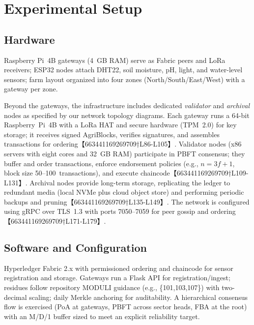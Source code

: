 \section{Experimental Setup}

\subsection{Hardware}
Raspberry Pi~4B gateways (4~GB RAM) serve as Fabric peers and LoRa receivers; ESP32 nodes attach DHT22, soil moisture, pH, light, and water-level sensors; farm layout organized into four zones (North/South/East/West) with a gateway per zone. %

Beyond the gateways, the infrastructure includes dedicated \emph{validator} and \emph{archival} nodes as specified by our network topology diagrams.  Each gateway runs a 64-bit Raspberry~Pi~4B with a LoRa HAT and secure hardware (TPM~2.0) for key storage; it receives signed AgriBlocks, verifies signatures, and assembles transactions for ordering【663441169269709†L86-L105】.  Validator nodes (x86 servers with eight cores and 32~GB RAM) participate in PBFT consensus; they buffer and order transactions, enforce endorsement policies (e.g., $n=3f+1$, block size 50–100~transactions), and execute chaincode【663441169269709†L109-L131】.  Archival nodes provide long-term storage, replicating the ledger to redundant media (local NVMe plus cloud object store) and performing periodic backups and pruning【663441169269709†L135-L149】.  The network is configured using gRPC over TLS~1.3 with ports 7050–7059 for peer gossip and ordering【663441169269709†L171-L179】.

\subsection{Software and Configuration}
Hyperledger Fabric 2.x with permissioned ordering and chaincode for sensor registration and storage. Gateways run a Flask API for registration/ingest; residues follow repository MODULI guidance (e.g., \{101,103,107\}) with two-decimal scaling; daily Merkle anchoring for auditability. A hierarchical consensus flow is exercised (PoA at gateways, PBFT across sector heads, FBA at the root) with an M/D/1 buffer sized to meet an explicit reliability target.\ %

